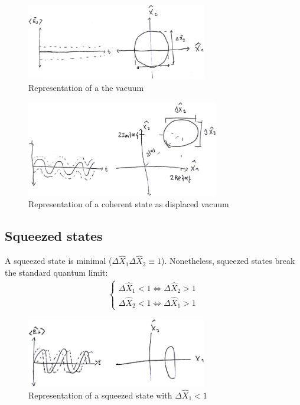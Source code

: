 \begin{figure}[H]
	\centering
	\includegraphics[width=0.7\textwidth]{./images/4-vacuum}
	\caption{Representation of a the vacuum}
	\label{fig:vacuum}
\end{figure}
\begin{figure}[H]
	\centering
	\includegraphics[width=0.75\textwidth]{./images/4-coherent}
	\caption{Representation of a coherent state as displaced vacuum}
	\label{fig:coherent}
\end{figure}

\subsection{Squeezed states}
\begin{defi}
	A squeezed state is minimal ($\Delta \hat{X}_{1} \Delta \hat{X}_{2} \equiv 1$). Nonetheless, squeezed states break the standard quantum limit:
	\begin{align*}
		\begin{cases}
			\Delta \hat{X}_{1} < 1 \Leftrightarrow \Delta \hat{X}_{2} > 1 \\
			\Delta \hat{X}_{2} < 1 \Leftrightarrow \Delta \hat{X}_{1} > 1
		\end{cases}
	\end{align*}
\end{defi}
\begin{figure}[H]
	\centering
	\includegraphics[width=0.7\textwidth]{./images/4-squeezed-x1}
	\caption{Representation of a squeezed state with $\Delta \hat{X}_{1} < 1$}
	\label{fig:squeezed1}
\end{figure}

